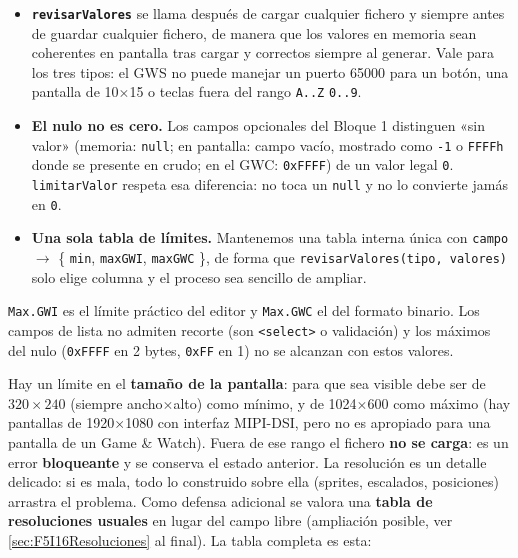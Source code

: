 \begin{itemize}
	\item \textbf{\texttt{revisarValores}} se llama después de cargar cualquier fichero y siempre antes de guardar cualquier fichero, de manera que los valores en memoria sean coherentes en pantalla tras cargar y correctos siempre al generar. Vale para los tres tipos: el GWS no puede manejar un puerto 65000 para un botón, una pantalla de 10$\times$15 o teclas fuera del rango \texttt{A..Z} \texttt{0..9}.
	\item \textbf{El nulo no es cero.} Los campos opcionales del Bloque 1 distinguen «sin valor» (memoria: \texttt{null}; en pantalla: campo vacío, mostrado como \texttt{-1} o \texttt{FFFFh} donde se presente en crudo; en el GWC: \texttt{0xFFFF}) de un valor legal \texttt{0}. \texttt{limitarValor} respeta esa diferencia: no toca un \texttt{null} y no lo convierte jamás en \texttt{0}.
	\item \textbf{Una sola tabla de límites.} Mantenemos una tabla interna única con \texttt{campo} $\rightarrow$ \{ \texttt{min}, \texttt{maxGWI}, \texttt{maxGWC} \}, de forma que \texttt{revisarValores(tipo, valores)} solo elige columna y el proceso sea sencillo de ampliar. 
\end{itemize}

\texttt{Max.GWI} es el límite práctico del editor y \texttt{Max.GWC} el del formato binario. Los campos de lista no admiten recorte (son \texttt{<select>} o validación) y los máximos del nulo (\texttt{0xFFFF} en 2 bytes, \texttt{0xFF} en 1) no se alcanzan con estos valores. 

Hay un límite en el \textbf{tamaño de la pantalla}: para que sea visible debe ser de $320\times240$ (siempre ancho$\times$alto) como mínimo, y de 1024$\times$600 como máximo (hay pantallas de 1920$\times$1080 con interfaz MIPI-DSI, pero no es apropiado para una pantalla de un Game \& Watch). Fuera de ese rango el fichero \textbf{no se carga}: es un error \textbf{bloqueante} y se conserva el estado anterior. La resolución es un detalle delicado: si es mala, todo lo construido sobre ella (sprites, escalados, posiciones) arrastra el problema. Como defensa adicional se valora una \textbf{tabla de resoluciones usuales} en lugar del campo libre (ampliación posible, ver \ref{sec:F5I16Resoluciones} al final). La tabla completa es esta:

